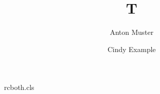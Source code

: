 \begin{filecontents*}[overwrite]{rcboth.cls}
\newcommand*\institution[1]{\def\@institution{#1}}
\institution{}
\def\@maketitle{\@title\par\@author\par\@institution}
\end{filecontents*}
\documentclass{rcboth}
\title{T}\author{Anton Muster \and Cindy Example}

\maketitle
Text.

